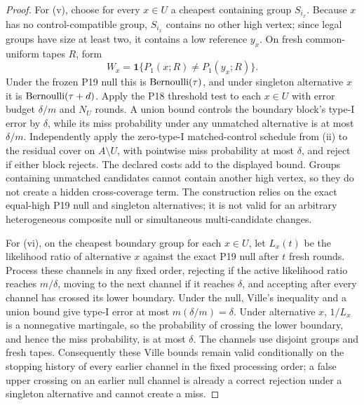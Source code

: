 \begin{proof}
For (v), choose for every \(x\in U\) a cheapest containing group
\(S_{i_x}\).  Because \(x\) has no control-compatible group,
\(S_{i_x}\) contains no other high vertex; since legal groups have size at
least two, it contains a low reference \(y_x\).  On fresh common-uniform
tapes \(R\), form
\[
W_x=\mathbf 1\{P_1(x;R)\ne P_1(y_x;R)\}.
\]
Under the frozen P19 null this is \({\rm Bernoulli}(\tau)\), and under
singleton alternative \(x\) it is \({\rm Bernoulli}(\tau+d)\).  Apply the
P18 threshold test to each \(x\in U\) with error budget \(\delta/m\) and
\(N_U\) rounds.  A union bound controls the boundary block's type-I error by
\(\delta\), while its miss probability under any unmatched alternative is at
most \(\delta/m\).  Independently apply the zero-type-I matched-control
schedule from (ii) to the residual cover on \(A\setminus U\), with pointwise
miss probability at most \(\delta\), and reject if either block rejects.
The declared costs add to the displayed bound.  Groups containing unmatched
candidates cannot contain another high vertex, so they do not create a hidden
cross-coverage term.  The construction relies on the exact equal-high P19 null
and singleton alternatives; it is not valid for an arbitrary heterogeneous
composite null or simultaneous multi-candidate changes.

For (vi), on the cheapest boundary group for each \(x\in U\), let \(L_x(t)\)
be the likelihood ratio of alternative \(x\) against the exact P19 null after
\(t\) fresh rounds.  Process these channels in any fixed order, rejecting if
the active likelihood ratio reaches \(m/\delta\), moving to the next channel
if it reaches \(\delta\), and accepting after every channel has crossed its
lower boundary.  Under the null, Ville's inequality and a union bound give
type-I error at most \(m(\delta/m)=\delta\).  Under alternative \(x\),
\(1/L_x\) is a nonnegative martingale, so the probability of crossing the
lower boundary, and hence the miss probability, is at most \(\delta\).
The channels use disjoint groups and fresh tapes.  Consequently these Ville
bounds remain valid conditionally on the stopping history of every earlier
channel in the fixed processing order; a false upper crossing on an earlier
null channel is already a correct rejection under a singleton alternative and
cannot create a miss.


\end{proof}
